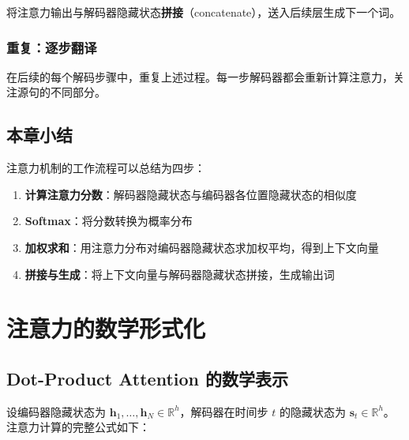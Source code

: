 \documentclass[a4paper]{article}
\begin{document}
将注意力输出与解码器隐藏状态\textbf{拼接}（concatenate），送入后续层生成下一个词。





\subsubsection{重复：逐步翻译}

在后续的每个解码步骤中，重复上述过程。每一步解码器都会重新计算注意力，关注源句的不同部分。













\subsection{本章小结}

注意力机制的工作流程可以总结为四步：
\begin{enumerate}
    \item \textbf{计算注意力分数}：解码器隐藏状态与编码器各位置隐藏状态的相似度
    \item \textbf{Softmax}：将分数转换为概率分布
    \item \textbf{加权求和}：用注意力分布对编码器隐藏状态求加权平均，得到上下文向量
    \item \textbf{拼接与生成}：将上下文向量与解码器隐藏状态拼接，生成输出词
\end{enumerate}


\section{注意力的数学形式化}

\subsection{Dot-Product Attention 的数学表示}





设编码器隐藏状态为 $\mathbf{h}_1, \ldots, \mathbf{h}_N \in \mathbb{R}^h$，解码器在时间步 $t$ 的隐藏状态为 $\mathbf{s}_t \in \mathbb{R}^h$。注意力计算的完整公式如下：
\end{document}
